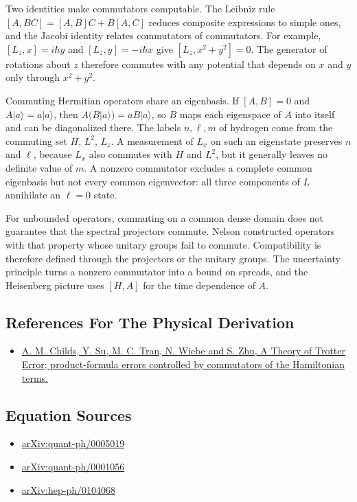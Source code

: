 \documentclass[11pt,oneside]{book}
\begin{document}
Two identities make commutators computable. The Leibniz rule \([A,BC]=[A,B]C+B[A,C]\) reduces composite expressions to simple ones, and the Jacobi identity relates commutators of commutators. For example, \([L_z,x]=i\hbar y\) and \([L_z,y]=-i\hbar x\) give \([L_z,x^2+y^2]=0\). The generator of rotations about \(z\) therefore commutes with any potential that depends on \(x\) and \(y\) only through \(x^2+y^2\).

Commuting Hermitian operators share an eigenbasis. If \([A,B]=0\) and \(A|a\rangle=a|a\rangle\), then \(A(B|a\rangle)=aB|a\rangle\), so \(B\) maps each eigenspace of \(A\) into itself and can be diagonalized there. The labels \(n,\ell,m\) of hydrogen come from the commuting set \(H\), \(L^2\), \(L_z\). A measurement of \(L_x\) on such an eigenstate preserves \(n\) and \(\ell\), because \(L_x\) also commutes with \(H\) and \(L^2\), but it generally leaves no definite value of \(m\). A nonzero commutator excludes a complete common eigenbasis but not every common eigenvector: all three components of \(L\) annihilate an \(\ell=0\) state.

For unbounded operators, commuting on a common dense domain does not guarantee that the spectral projectors commute. Nelson constructed operators with that property whose unitary groups fail to commute. Compatibility is therefore defined through the projectors or the unitary groups. The uncertainty principle turns a nonzero commutator into a bound on spreads, and the Heisenberg picture uses \([H,A]\) for the time dependence of \(A\).

\subsection*{References For The Physical Derivation}
\begin{itemize}
\item \href{https://arxiv.org/abs/1912.08854}{A. M. Childs, Y. Su, M. C. Tran, N. Wiebe and S. Zhu, A Theory of Trotter Error; product-formula errors controlled by commutators of the Hamiltonian terms.}
\end{itemize}



\subsection*{Equation Sources}
\begin{itemize}
\item \href{https://arxiv.org/abs/quant-ph/0005019}{arXiv:quant-ph/0005019}
\item \href{https://arxiv.org/abs/quant-ph/0001056}{arXiv:quant-ph/0001056}
\item \href{https://arxiv.org/abs/hep-ph/0104068}{arXiv:hep-ph/0104068}
\end{itemize}
\end{document}
